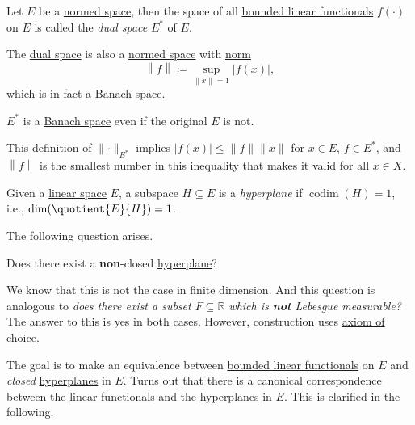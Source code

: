 \begin{definition}\label{def:dual-space}
	Let \(E\) be a \hyperref[def:normed-vector-space]{normed space}, then the space of all \hyperref[def:bounded-linear-functional]{bounded linear functionals} \(f(\cdot)\) on \(E\) is called the \emph{dual space} \(E^{\ast} \) of \(E\).
\end{definition}

The \hyperref[def:dual-space]{dual space} is also a \hyperref[def:normed-vector-space]{normed space} with \hyperref[def:norm]{norm}
\[
	\left\lVert f\right\rVert \coloneqq \sup _{\left\lVert x\right\rVert = 1}\left\vert f(x) \right\vert,
\]
which is in fact a \hyperref[def:Banach-space]{Banach space}.

\begin{remark}
	\(E^{\ast} \) is a \hyperref[def:Banach-space]{Banach space} even if the original \(E\) is not.
\end{remark}

This definition of \(\lVert \cdot \rVert _{E^{\ast} }\) implies \(\vert f(x) \vert \leq \lVert f \rVert \lVert x \rVert\) for \(x\in E\), \(f\in E^{\ast} \), and \(\left\lVert f\right\rVert \) is the smallest number in this inequality that makes it valid for all \(x\in X\).

\begin{definition}[Hyperplane]\label{def:hyperplane}
	Given a \hyperref[def:linear-vector-space]{linear space} \(E\), a subspace \(H\subseteq E\) is a \emph{hyperplane} if \(\mathop{\mathrm{codim}}(H)=1\), i.e., \(\dim (\quotient{E}{H})=1\).
\end{definition}

The following question arises.

\begin{problem}
Does there exist a \textbf{non}-closed \hyperref[def:hyperplane]{hyperplane}?
\end{problem}
\begin{answer}
	We know that this is not the case in finite dimension. And this question is analogous to \emph{does there exist a subset \(F\subseteq \mathbb{R} \) which is \textbf{not} Lebesgue measurable?} The answer to this is yes in both cases. However, construction uses \href{https://en.wikipedia.org/wiki/Axiom_of_choice}{axiom of choice}.
\end{answer}

The goal is to make an equivalence between \hyperref[def:bounded-linear-functional]{bounded linear functionals} on \(E\) and \emph{closed} \hyperref[def:hyperplane]{hyperplanes} in \(E\). Turns out that there is a canonical correspondence between the \hyperref[def:linear-functional]{linear functionals} and the \hyperref[def:hyperplane]{hyperplanes} in \(E\). This is clarified in the following.

